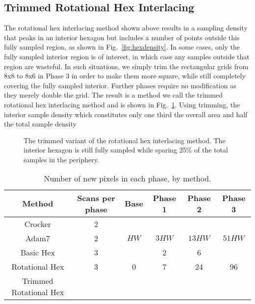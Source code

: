 \documentclass{article}
\newcommand{\reffig}[1]{Fig.~\ref{fig:#1}}
\begin{document}
\subsection{Trimmed Rotational Hex Interlacing}
\label{sec:trimmed}

The rotational hex interlacing method shown above results in a sampling density that peaks in an interior hexagon but includes a number of points outside this fully sampled region, as shown in \reffig{hexdensity}.
%
In some cases, only the fully sampled interior region is of interest, in which case any samples outside that region are wasteful.
%
In such situations, we simply trim the rectangular grids from 8x8 to 8x6 in Phase 3 in order to make them more square, while still completely covering the fully sampled interior.
%
Further phases require no modification as they merely double the grid.
%
The result is a method we call the trimmed rotational hex interlacing method and is shown in \reffig{trimmedrotatingphases}.
%
Using trimming, the interior sample density which constitutes only one third the overall area and half the total sample density

\begin{figure}[ht]
\centering
\caption{
\label{fig:trimmedrotatingphases} 
The trimmed variant of the rotational hex interlacing method.
%
The interior hexagon is still fully sampled while sparing 25\% of the total samples in the periphery.
}
\end{figure}


\begin{table}[ht]
	\centering
\caption{\label{table:passsizes} Number of new pixels in each phase, by method.}
\begin{tabular}{c|c|cccc}
	Method & Scans per phase & Base & Phase 1 & Phase 2 & Phase 3 \\
	\hline
	Crocker & 2 & & & & \\
	Adam7 & 2 & $HW$ & $3HW$ & $13HW$ & $51HW$ \\
	Basic Hex & 3 &  & 2 & 6 & \\
	Rotational Hex & 3 & 0 & 7 & 24 & 96 \\
	Trimmed Rotational Hex & & & &
\end{tabular}
\end{table}
\end{document}
